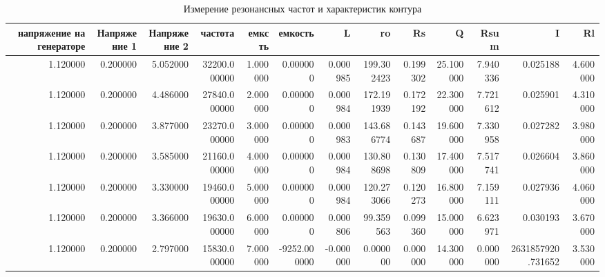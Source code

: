 \documentclass[a4paper, 12pt]{article}
\begin{document}
\begin{table}[h!]
	\begin{tabular}{rrrrrrrrrrrrr}
        \toprule
        напряжение на генераторе & Напряжение 1 & Напряжение 2 & частота & емксть & емкость & L & ro & Rs & Q & Rsum & I & Rl \\
        \midrule
        1.120000 & 0.200000 & 5.052000 & 32200.000000 & 1.000000 & 0.000000 & 0.000985 & 199.302423 & 0.199302 & 25.100000 & 7.940336 & 0.025188 & 4.600000 \\
        1.120000 & 0.200000 & 4.486000 & 27840.000000 & 2.000000 & 0.000000 & 0.000984 & 172.191939 & 0.172192 & 22.300000 & 7.721612 & 0.025901 & 4.310000 \\
        1.120000 & 0.200000 & 3.877000 & 23270.000000 & 3.000000 & 0.000000 & 0.000983 & 143.686774 & 0.143687 & 19.600000 & 7.330958 & 0.027282 & 3.980000 \\
        1.120000 & 0.200000 & 3.585000 & 21160.000000 & 4.000000 & 0.000000 & 0.000984 & 130.808698 & 0.130809 & 17.400000 & 7.517741 & 0.026604 & 3.860000 \\
        1.120000 & 0.200000 & 3.330000 & 19460.000000 & 5.000000 & 0.000000 & 0.000984 & 120.273066 & 0.120273 & 16.800000 & 7.159111 & 0.027936 & 4.060000 \\
        1.120000 & 0.200000 & 3.366000 & 19630.000000 & 6.000000 & 0.000000 & 0.000806 & 99.359563 & 0.099360 & 15.000000 & 6.623971 & 0.030193 & 3.670000 \\
        1.120000 & 0.200000 & 2.797000 & 15830.000000 & 7.000000 & -9252.000000 & -0.000000 & 0.000000 & 0.000000 & 14.300000 & 0.000000 & 2631857920.731652 & 3.530000 \\
        \bottomrule
        \end{tabular}
	\caption{Измерение резонансных частот и характеристик контура}
	\end{table}
\end{document}
